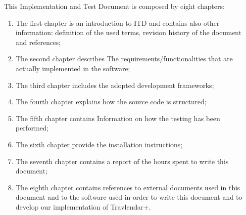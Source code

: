 This Implementation and Test Document is composed by eight chapters:
\begin{enumerate}
\item The first chapter is an introduction to ITD and contains also other information: definition of the used terms, revision history of the document and references;
\item The second chapter describes The
requirements/functionalities that are actually implemented in the software;
\item The third chapter includes the adopted
development frameworks;
\item The fourth chapter explains how the source code is structured;
\item The fifth chapter contains Information
on how the testing has been performed;
\item The sixth chapter provide the installation instructions;
\item The seventh chapter contains a report of the hours spent to write this document;
\item The eighth chapter contains references to external documents used in this document and to the software used in order to write this document and to develop our implementation of Travlendar+.
\end{enumerate}
